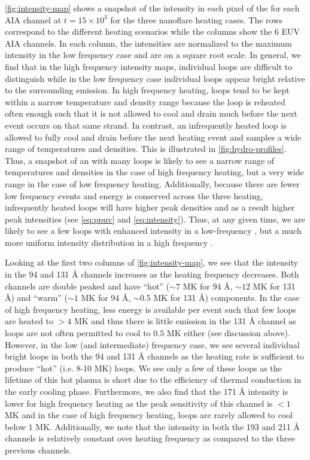 \autoref{fig:intensity-map} shows a snapshot of the intensity in each pixel of the \AR{} for each AIA channel at $t=15\times10^3$ for the three nanoflare heating cases. The rows correspond to the different heating scenarios while the columns show the 6 EUV AIA channels. In each column, the intensities are normalized to the maximum intensity in the low frequency case and are on a square root scale. In general, we find that in the high frequency intensity maps, individual loops are difficult to distinguish while in the low frequency case individual loops appear bright relative to the surrounding emission. In high frequency heating, loops tend to be kept within a narrow temperature and density range because the loop is reheated often enough such that it is not allowed to cool and drain much before the next event occurs on that same strand. In contrast, an infrequently heated loop is allowed to fully cool and drain before the next heating event and samples a wide range of temperatures and densities. This is illustrated in \autoref{fig:hydro-profiles}. Thus, a snapshot of an \AR{} with many loops is likely to see a narrow range of temperatures and densities in the case of high frequency heating, but a very wide range in the case of low frequency heating. Additionally, because there are fewer low frequency events and energy is conserved across the three heating, infrequently heated loops will have higher peak densities and as a result higher peak intensities (see \autoref{eq:ppuv} and \ref{eq:intensity}). Thus, at any given time, we are likely to see a few loops with enhanced intensity in a low-frequency \AR{}, but a much more uniform intensity distribution in a high frequency \AR{}.

Looking at the first two columns of \autoref{fig:intensity-map}, we see that the intensity in the 94 and 131 \AA{} channels increases as the heating frequency decreases. Both channels are double peaked and have ``hot'' ($\sim7$ MK for 94 \AA{}, $\sim12$ MK for 131 \AA{}) and ``warm'' ($\sim1$ MK for 94 \AA{}, $\sim0.5$ MK for 131 \AA{}) components. In the case of high frequency heating, less energy is available per event such that few loops are heated to $>4$ MK and thus there is little emission in the 131 \AA{} channel as loops are not often permitted to cool to $0.5$ MK either (see discussion above). However, in the low (and intermediate) frequency case, we see several individual bright loops in both the 94 and 131 \AA{} channels as the heating rate is sufficient to produce ``hot'' (i.e. 8-10 MK) loops. We see only a few of these loops as the lifetime of this hot plasma is short due to the efficiency of thermal conduction in the early cooling phase. Furthermore, we also find that the 171 \AA{} intensity is lower for high frequency heating as the peak sensitivity of this channel is $<1$ MK and in the case of high frequency heating, loops are rarely allowed to cool below $1$ MK. Additionally, we note that the intensity in both the 193 and 211 \AA{} channels is relatively constant over heating frequency as compared to the three previous channels.  

